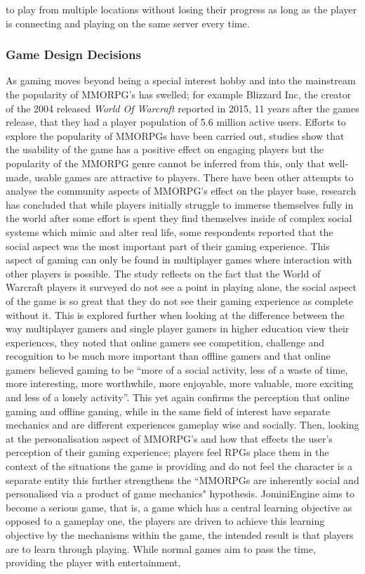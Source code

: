 \documentclass{article}
\begin{document}
to play from multiple locations without losing their progress as long as the player is connecting and playing on the same server every time.
	\subsubsection{Game Design Decisions}
	As gaming moves beyond being a special interest hobby and into the mainstream the popularity of MMORPG’s has swelled; for example Blizzard Inc, the creator of the 2004 released \textit{World Of Warcraft} reported in 2015, 11 years after the games release, that they had a player population of 5.6 million active users. Efforts to explore the popularity of MMORPGs have been carried out\cite{Christou:2012:EPP:2367616.2367630}, studies show that the usability of the game has a positive effect on engaging players but the popularity of the MMORPG genre cannot be inferred from this, only that well-made, usable games are attractive to players. There have been other attempts to analyse the community aspects of MMORPG’s effect on the player base\cite{DoThoseWhoPlay}, research has concluded that while players initially struggle to immerse themselves fully in the world after some effort is spent they find themselves inside of complex social systems which mimic and alter real life, some respondents reported that the social aspect was the most important part of their gaming experience. This aspect of gaming can only be found in multiplayer games where interaction with other players is possible. The study reflects on the fact that the World of Warcraft players it surveyed do not see a point in playing alone, the social aspect of the game is so great that they do not see their gaming experience as complete without it. This is explored further when looking at the\cite{Hainey:2011:DMO:2304793.2305216} difference between the way multiplayer gamers and single player gamers in higher education view their experiences, they noted that online gamers see competition, challenge and recognition to be much more important than offline gamers and that online gamers believed gaming to be “more of a social activity, less of a waste of time, more interesting, more worthwhile, more enjoyable, more valuable, more exciting and less of a lonely activity”. This yet again confirms the perception that online gaming and offline gaming, while in the same field of interest have separate mechanics and are different experiences gameplay wise and socially. Then, looking at the personalisation aspect of MMORPG’s and how that effects the user’s perception of their gaming experience; players feel RPGs place them in the context of the situations the game is providing and do not feel the character is a separate entity\cite{bowman:2012:EPP:2367616.2367630} this further strengthens the “MMORPGs are inherently social and personalised via a product of game mechanics" hypothesis. JominiEngine aims to become a serious game, that is, a game which has a central learning objective as opposed to a gameplay one, the players are driven to achieve this learning objective by the mechanisms within the game, the intended result is that players are to learn through playing. While normal games aim to pass the time, providing the player with entertainment, 
\end{document}
